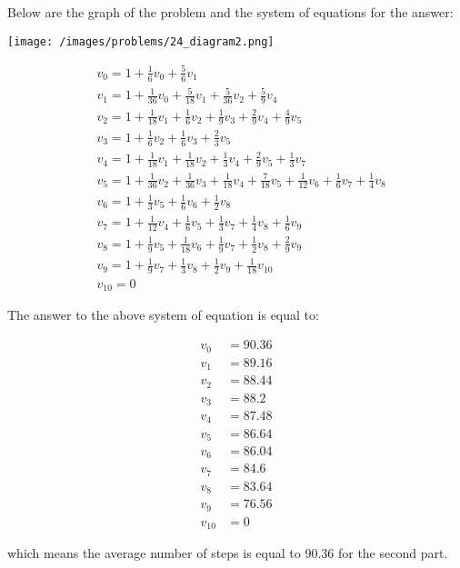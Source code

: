 \begin{solution}
Below are the graph of the problem and the system of equations for the answer:

\begin{center}
	\texttt{[image: /images/problems/24\_diagram2.png]}
\end{center}


$$
\begin{aligned}
&v_0 = 1 + \frac{1}{6}v_0 + \frac{5}{6}v_1 \\
&v_1 = 1 + \frac{1}{36}v_0 + \frac{5}{18}v_1 + \frac{5}{36}v_2 + \frac{5}{9}v_4 \\
&v_2 = 1 + \frac{1}{18}v_1 + \frac{1}{6}v_2 + \frac{1}{9}v_3 + \frac{2}{9}v_4 + \frac{4}{ 9}v_5 \\
&v_3 = 1 + \frac{1}{6}v_2 + \frac{1}{6}v_3 + \frac{2}{3}v_5 \\
&v_4 = 1 + \frac{1}{18}v_1 + \frac{1}{18}v_2 + \frac{1}{3}v_4 + \frac{2}{9}v_5 + \frac{1}{ 3}v_7 \\
&v_5 = 1 + \frac{1}{36}v_2 + \frac{1}{36}v_3 + \frac{1}{18}v_4 + \frac{7}{18}v_5 + \frac{1}{ 12}v_6 + \frac{1}{6}v_7 + \frac{1}{4}v_8 \\
&v_6 = 1 + \frac{1}{3}v_5 + \frac{1}{6}v_6 + \frac{1}{2}v_8 \\
&v_7 = 1 + \frac{1}{12}v_4 + \frac{1}{6}v_5 + \frac{1}{3}v_7 + \frac{1}{4}v_8 + \frac{1}{ 6}v_9 \\
&v_8 = 1 + \frac{1}{9}v_5 + \frac{1}{18}v_6 + \frac{1}{9}v_7 + \frac{1}{2}v_8 + \frac{2}{ 9}v_9 \\
&v_9 = 1 + \frac{1}{9}v_7 + \frac{1}{3}v_8 + \frac{1}{2}v_9 + \frac{1}{18}v_{10} \\
&v_{10} = 0
\end{aligned}
$$

The answer to the above system of equation is equal to:

$$
\begin{aligned}
v_0 &= 90.36 \\
v_1 &= 89.16 \\
v_2 &= 88.44 \\
v_3 &= 88.2 \\
v_4 &= 87.48 \\
v_5 &= 86.64 \\
v_6 &= 86.04 \\
v_7 &= 84.6 \\
v_8 &= 83.64 \\
v_9 &= 76.56 \\
v_{10} &= 0
\end{aligned}
$$

which means the average number of steps is equal to 90.36 for the second part.



\end{solution}
